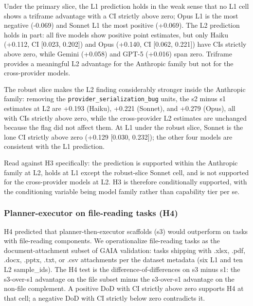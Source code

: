 \documentclass[10pt]{article} %
\begin{document}
            Under the primary slice, the L1 prediction holds in the weak sense that no L1 cell shows a triframe advantage with a CI strictly above zero; Opus L1 is the most negative (-0.069) and Sonnet L1 the most positive (+0.069). The L2 prediction holds in part: all five models show positive point estimates, but only Haiku (+0.112, CI [0.023, 0.202]) and Opus (+0.140, CI [0.062, 0.221]) have CIs strictly above zero, while Gemini (+0.058) and GPT-5 (+0.016) span zero. Triframe provides a meaningful L2 advantage for the Anthropic family but not for the cross-provider models.
        
            The robust slice makes the L2 finding considerably stronger inside the Anthropic family: removing the \texttt{provider\_serialization\_bug} units, the s2 minus s1 estimates at L2 are +0.193 (Haiku), +0.221 (Sonnet), and +0.279 (Opus), all with CIs strictly above zero, while the cross-provider L2 estimates are unchanged because the flag did not affect them. At L1 under the robust slice, Sonnet is the lone CI strictly above zero (+0.129 [0.030, 0.232]); the other four models are consistent with the L1 prediction.
            
            Read against H3 specifically: the prediction is supported within the Anthropic family at L2, holds at L1 except the robust-slice Sonnet cell, and is not supported for the cross-provider models at L2. H3 is therefore conditionally supported, with the conditioning variable being model family rather than capability tier per se.

        \subsubsection{Planner-executor on file-reading tasks (H4)}\label{sec:h4}
        
            H4 predicted that planner-then-executor scaffolds (s3) would outperform on tasks with file-reading components. We operationalize file-reading tasks as the document-attachment subset of GAIA validation: tasks shipping with .xlsx, .pdf, .docx, .pptx, .txt, or .csv attachments per the dataset metadata (six L1 and ten L2 sample\_ids). The H4 test is the difference-of-differences on s3 minus s1: the s3-over-s1 advantage on the file subset minus the s3-over-s1 advantage on the non-file complement. A positive DoD with CI strictly above zero supports H4 at that cell; a negative DoD with CI strictly below zero contradicts it.
\end{document}
